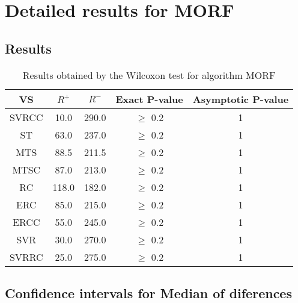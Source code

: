 \documentclass[a4paper,10pt]{article}
\begin{document}
\section{Detailed results for MORF}


\subsection{Results}

\begin{table}[!htp]
\centering\small
\begin{tabular}{
|c|c|c|c|c|}
\hline
 VS & $R^{+}$ & $R^{-}$ & Exact P-value & Asymptotic P-value \\ \hline 
SVRCC & 10.0 & 290.0 & $\geq$ 0.2 & 1\\ \hline 
ST & 63.0 & 237.0 & $\geq$ 0.2 & 1\\ \hline 
MTS & 88.5 & 211.5 & $\geq$ 0.2 & 1\\ \hline 
MTSC & 87.0 & 213.0 & $\geq$ 0.2 & 1\\ \hline 
RC & 118.0 & 182.0 & $\geq$ 0.2 & 1\\ \hline 
ERC & 85.0 & 215.0 & $\geq$ 0.2 & 1\\ \hline 
ERCC & 55.0 & 245.0 & $\geq$ 0.2 & 1\\ \hline 
SVR & 30.0 & 270.0 & $\geq$ 0.2 & 1\\ \hline 
SVRRC & 25.0 & 275.0 & $\geq$ 0.2 & 1\\ \hline 

\end{tabular}
\caption{Results obtained by the Wilcoxon test for algorithm MORF}
\end{table}

\subsection{Confidence intervals for Median of diferences}
\end{document}
